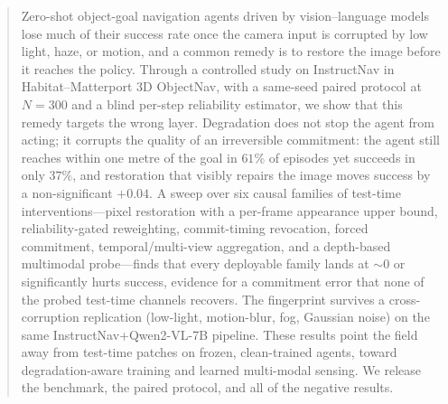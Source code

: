\begin{abstract}
Zero-shot object-goal navigation agents driven by vision--language
models lose much of their success rate once the camera input is
corrupted by low light, haze, or motion, and a common remedy is to
restore the image before it reaches the policy. Through a controlled
study on InstructNav in Habitat--Matterport 3D ObjectNav, with a
same-seed paired protocol at $N{=}300$ and a blind per-step reliability
estimator, we show that this remedy targets the wrong layer.
Degradation does not stop the agent from acting; it corrupts the
quality of an irreversible commitment: the agent still reaches within
one metre of the goal in $61\%$ of episodes yet succeeds in only
$37\%$, and restoration that visibly repairs the image moves success
by a non-significant $+0.04$. A sweep over six causal families of
test-time interventions---pixel restoration with a per-frame appearance
upper bound, reliability-gated reweighting, commit-timing revocation,
forced commitment, temporal/multi-view aggregation, and a depth-based
multimodal probe---finds that every deployable family lands at
${\sim}0$ or significantly hurts success, evidence for a commitment
error that none of the probed test-time channels recovers.
The fingerprint survives a cross-corruption replication
(low-light, motion-blur, fog, Gaussian noise) on the same
InstructNav+Qwen2-VL-7B pipeline. These
results point the field away from test-time patches on frozen,
clean-trained agents, toward degradation-aware training and learned
multi-modal sensing. We release the benchmark, the paired protocol,
and all of the negative results.
\end{abstract}